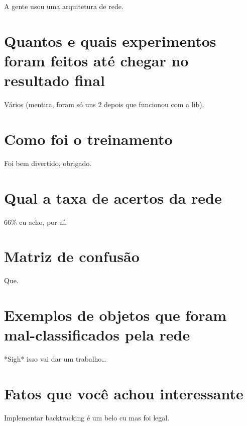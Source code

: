 \documentclass[twocolumn]{article}
\begin{document}
    A gente usou uma arquitetura de rede.

    \section{Quantos e quais experimentos foram feitos até chegar no resultado final}

    Vários (mentira, foram só uns 2 depois que funcionou com a lib).

    \section{Como foi o treinamento}

    Foi bem divertido, obrigado.

    \section{Qual a taxa de acertos da rede}

    66\% eu acho, por aí.

    \section{Matriz de confusão}

    Que.

    \section{Exemplos de objetos que foram mal-classificados pela rede}

    *Sigh* isso vai dar um trabalho\ldots

    \section{Fatos que você achou interessante}

    Implementar backtracking é um belo cu mas foi legal.

    
    
    \nocite{*}
\end{document}
